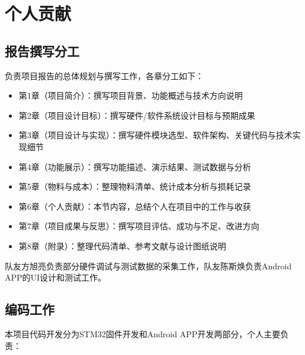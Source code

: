 
\section{个人贡献}

\subsection{报告撰写分工}
负责项目报告的总体规划与撰写工作，各章分工如下：
\begin{itemize}
    \item 第1章（项目简介）：撰写项目背景、功能概述与技术方向说明
    \item 第2章（项目设计目标）：撰写硬件/软件系统设计目标与预期成果
    \item 第3章（项目设计与实现）：撰写硬件模块选型、软件架构、关键代码与技术实现细节
    \item 第4章（功能展示）：撰写功能描述、演示结果、测试数据与分析
    \item 第5章（物料与成本）：整理物料清单、统计成本分析与损耗记录
    \item 第6章（个人贡献）：本节内容，总结个人在项目中的工作与收获
    \item 第7章（项目成果与反思）：撰写项目评估、成功与不足、改进方向
    \item 第8章（附录）：整理代码清单、参考文献与设计图纸说明
\end{itemize}
队友方旭亮负责部分硬件调试与测试数据的采集工作，队友陈斯焕负责Android APP的UI设计和测试工作。

\subsection{编码工作}
本项目代码开发分为STM32固件开发和Android APP开发两部分，个人主要负责：


